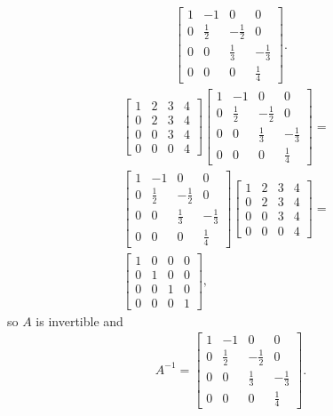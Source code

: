 \documentclass[12pt]{article}
\begin{document}
\begin{enumerate}
\begin{align*}
      \begin{bmatrix}
        1 & -1 & 0 & 0\\
        0 & \frac{1}{2} & -\frac{1}{2} & 0\\
        0 & 0 & \frac{1}{3} & -\frac{1}{3}\\
        0 & 0 & 0 & \frac{1}{4}
      \end{bmatrix}.
    \end{align*}
    \begin{align*}
      \begin{bmatrix}
        1 & 2 & 3 & 4\\
        0 & 2 & 3 & 4\\
        0 & 0 & 3 & 4\\
        0 & 0 & 0 & 4
      \end{bmatrix}
      \begin{bmatrix}
        1 & -1 & 0 & 0\\
        0 & \frac{1}{2} & -\frac{1}{2} & 0\\
        0 & 0 & \frac{1}{3} & -\frac{1}{3}\\
        0 & 0 & 0 & \frac{1}{4}
      \end{bmatrix}
      =&\\
      \begin{bmatrix}
        1 & -1 & 0 & 0\\
        0 & \frac{1}{2} & -\frac{1}{2} & 0\\
        0 & 0 & \frac{1}{3} & -\frac{1}{3}\\
        0 & 0 & 0 & \frac{1}{4}
      \end{bmatrix}
      \begin{bmatrix}
        1 & 2 & 3 & 4\\
        0 & 2 & 3 & 4\\
        0 & 0 & 3 & 4\\
        0 & 0 & 0 & 4
      \end{bmatrix}
      =&\\
      \begin{bmatrix}
        1 & 0 & 0 & 0\\
        0 & 1 & 0 & 0\\
        0 & 0 & 1 & 0\\
        0 & 0 & 0 & 1
      \end{bmatrix},
    \end{align*}
    so $A$ is invertible and
    \begin{align*}
      A^{-1} =
      \begin{bmatrix}
        1 & -1 & 0 & 0\\
        0 & \frac{1}{2} & -\frac{1}{2} & 0\\
        0 & 0 & \frac{1}{3} & -\frac{1}{3}\\
        0 & 0 & 0 & \frac{1}{4}
      \end{bmatrix}.
    \end{align*}


\end{enumerate}
\end{document}
